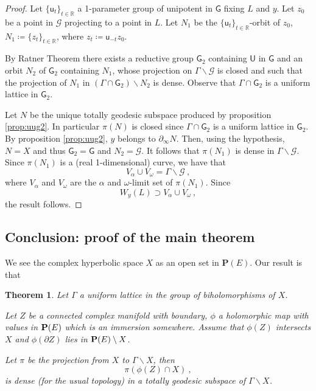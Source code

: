 \documentclass[12pt,reqno]{amsart}
\newtheorem{theorem}{Theorem}[subsection]
\newcommand{\mG}{\ms G}
\newcommand{\ms}{\mathsf}
\newcommand{\defeq}{\coloneqq}
\newcommand{\bP}{{\mathbf P}}
\newcommand{\cG}{\mathcal G}
\newcommand{\uu}{\mathsf u}
\newcommand{\mU}{\mathsf U}
\newcommand{\seqt}[1]{ \{{#1}\}_{t\in\mathbb R}}
\begin{document}
\begin{proof} Let $\seqt{\uu_t}$ a 1-parameter group of unipotent in $\mG$ fixing $L$ and $y$. Let $z_0$ be a point in $\cG$ projecting to a point in $L$. Let $N_1$ be the $\seqt{\uu_t}$-orbit of $z_0$, $N_1\defeq \{z_t\}_{t\in\mathbb R}$, where $z_t\defeq \uu_{-t}  z_0$.
	

By Ratner Theorem \cite[Theorem A]{Ratner:1991aa} there exists a reductive group $\mG_2$ containing $\mU$ in $\mG$ and an orbit $N_2$ of $\mG_2$  containing $N_1$, whose projection on $\Gamma\backslash \cG$ is closed and such that the projection of $N_1$  in $(\Gamma\cap \mG_2)\backslash N_2$ is dense. Observe that $\Gamma\cap \mG_2$ is a  uniform lattice in $\mG_2$.

Let $N$ be the unique totally geodesic subspace produced by proposition \ref{prop:uug2}. In particular $\pi(N)$ is closed since $\Gamma\cap\mG_2$ is a uniform lattice in $\mG_2$.  By proposition \ref{prop:uug2}, $y$ belongs to $\partial_\infty N$. Then, using the hypothesis, $N=X$ and thus $\mG_2=\mG$ and $N_2=\cG$. It follows that $\pi(N_1)$ is dense in $\Gamma\backslash \cG$. Since $\pi(N_1)$ is a (real 1-dimensional) curve, we have that  
$$
V_\alpha\cup V_\omega=\Gamma\backslash \cG\ ,
$$
where $V_\alpha$ and $V_\omega$ are the $\alpha$ and $\omega$-limit set of  $\pi(N_1)$. Since  
$$
W_y(L)\supset V_\alpha\cup V_\omega\ , 
$$
the result follows. 
\end{proof}
\subsection{Conclusion: proof of the main theorem}

We see the complex hyperbolic space $X$ as an open set in  $\bP(E)$.
Our result is that
\begin{theorem}
	Let $\Gamma$ a uniform lattice in the group of biholomorphisms of $X$.
	
	Let $Z$ be a connected complex manifold with boundary, $\phi$ a holomorphic map with values in ${\bf P}(E)$ which is an immersion somewhere. Assume that $\phi(Z)$ intersects $X$ and  $\phi(\partial Z)$ lies in ${\bf P}(E)\setminus X$. 
	
Let $\pi$ be the projection from $X$ to $\Gamma\backslash X$, then  $$\pi(\phi(Z)\cap X)\ ,$$ is dense (for the usual topology) in a totally geodesic subspace of  $\Gamma\backslash X$.
\end{theorem}
\end{document}

